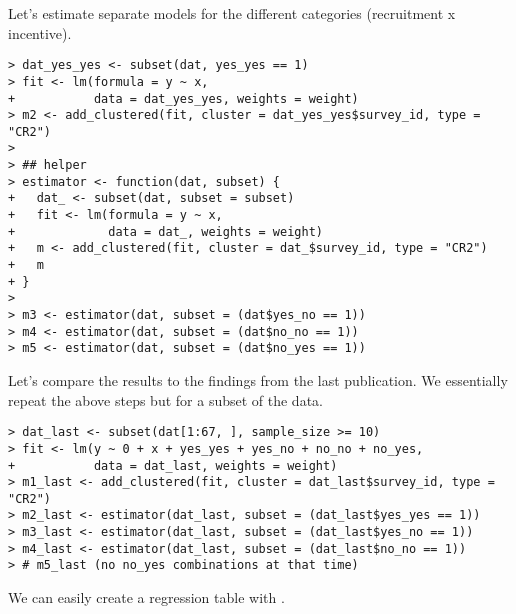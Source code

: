 \documentclass[a4paper]{article}\usepackage[]{graphicx}\usepackage[]{xcolor}
\makeatletter
\newenvironment{kframe}{%
 \def\at@end@of@kframe{}%
 \ifinner\ifhmode%
  \def\at@end@of@kframe{\end{minipage}}%
  \begin{minipage}{\columnwidth}%
 \fi\fi%
 \def\FrameCommand##1{\hskip\@totalleftmargin \hskip-\fboxsep
 \colorbox{shadecolor}{##1}\hskip-\fboxsep
     \hskip-\linewidth \hskip-\@totalleftmargin \hskip\columnwidth}%
 \MakeFramed {\advance\hsize-\width
   \@totalleftmargin\z@ \linewidth\hsize
   \@setminipage}}%
 {\par\unskip\endMakeFramed%
 \at@end@of@kframe}
\newenvironment{knitrout}{}{} %
\makeatother
\begin{document}
Let's estimate separate models for the different categories (recruitment x incentive).

\begin{knitrout}
\color{fgcolor}\begin{kframe}
\begin{verbatim}
> dat_yes_yes <- subset(dat, yes_yes == 1)
> fit <- lm(formula = y ~ x,
+           data = dat_yes_yes, weights = weight)
> m2 <- add_clustered(fit, cluster = dat_yes_yes$survey_id, type = "CR2")
> 
> ## helper
> estimator <- function(dat, subset) {
+   dat_ <- subset(dat, subset = subset)
+   fit <- lm(formula = y ~ x,
+             data = dat_, weights = weight)
+   m <- add_clustered(fit, cluster = dat_$survey_id, type = "CR2")
+   m
+ }
> 
> m3 <- estimator(dat, subset = (dat$yes_no == 1))
> m4 <- estimator(dat, subset = (dat$no_no == 1))
> m5 <- estimator(dat, subset = (dat$no_yes == 1))
\end{verbatim}
\end{kframe}
\end{knitrout}

Let's compare the results to the findings from the last publication. We essentially repeat the above steps but for a subset of the data.

\begin{knitrout}
\color{fgcolor}\begin{kframe}
\begin{verbatim}
> dat_last <- subset(dat[1:67, ], sample_size >= 10)
> fit <- lm(y ~ 0 + x + yes_yes + yes_no + no_no + no_yes,
+           data = dat_last, weights = weight)
> m1_last <- add_clustered(fit, cluster = dat_last$survey_id, type = "CR2")
> m2_last <- estimator(dat_last, subset = (dat_last$yes_yes == 1))
> m3_last <- estimator(dat_last, subset = (dat_last$yes_no == 1))
> m4_last <- estimator(dat_last, subset = (dat_last$no_no == 1))
> # m5_last (no no_yes combinations at that time)
\end{verbatim}
\end{kframe}
\end{knitrout}

We can easily create a regression table with .
\end{document}
